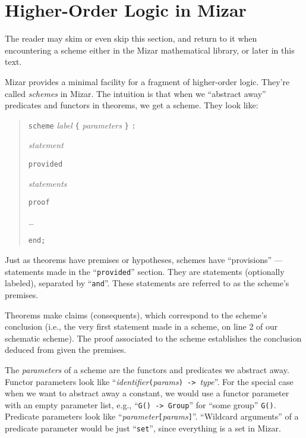 \section{Higher-Order Logic in Mizar}

\begin{ddanger}
The reader may skim or even skip this section, and return to it when
encountering a scheme either in the Mizar mathematical library, or later
in this text. 
\end{ddanger}

\bigbreak
Mizar provides a minimal facility for a fragment of higher-order
logic. They're called \emph{schemes} in Mizar. The intuition is that
when we ``abstract away'' predicates and functors in theorems, we get a
scheme. They look like:
\begin{quote}
\noindent\texttt{scheme} \textit{label} \verb#{# \emph{parameters} \verb#}# \texttt{:}

\noindent\qquad\emph{statement}

\noindent\texttt{provided}

\noindent\qquad\emph{statements}

\noindent\texttt{proof}

\noindent\qquad\dots

\noindent\texttt{end;}
\end{quote}
Just as theorems have premises or hypotheses, schemes have ``provisions'' ---
statements made in the ``\lstinline{provided}'' section. They are
statements (optionally labeled), separated by ``\lstinline{and}''. These
statements are referred to as the scheme's premises.

Theorems make claims (consequents), which correspond to the scheme's
conclusion (i.e., the very first statement made in a scheme, on line 2
of our schematic scheme). The proof associated to the scheme establishes
the conclusion deduced from given the premises.

The \emph{parameters} of a scheme are the functors and predicates we
abstract away. Functor parameters look like
``\emph{identifier}\verb#(#\emph{params}\verb#) -> #\emph{type}''. For
the special case when we want to abstract away a constant, we would use
a functor parameter with an empty parameter list, e.g.,
``\lstinline{G() -> Group}'' for ``some group'' \lstinline{G()}.
Predicate parameters look like ``\emph{parameter}\verb#[#\emph{params}\verb#]#''.
``Wildcard arguments'' of a predicate parameter would be just
``\lstinline{set}'', since everything is a set in Mizar.

